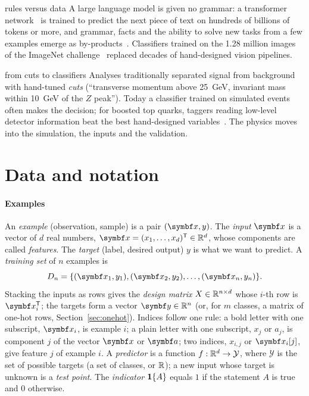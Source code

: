 \documentclass[11pt]{article}
\begin{document}
\begin{modern}{rules versus data}
A large language model is given no grammar: a transformer network~\cite{vaswani2017} is trained to predict the next
piece of text on hundreds of billions of tokens or more, and grammar, facts and the ability to solve new tasks from a
few examples emerge as by-products~\cite{brown2020}. Classifiers trained on the 1.28 million images of the ImageNet
challenge~\cite{russakovsky2015} replaced decades of hand-designed vision pipelines.
\end{modern}

\begin{physics}{from cuts to classifiers}
Analyses traditionally separated signal from background with hand-tuned \emph{cuts} (``transverse momentum above
25~GeV, invariant mass within 10~GeV of the $Z$ peak''). Today a classifier trained on simulated events often makes
the decision; for boosted top quarks, taggers reading low-level detector information beat the best hand-designed
variables~\cite{kasieczka2019}. The physics moves into the simulation, the inputs and the validation.
\end{physics}

\section{Data and notation}\label{sec:notation}

\paragraph{Examples} An \emph{example} (observation, sample) is a pair $(\x, y)$. The \emph{input} $\x$ is a
vector of $d$ real numbers, $\x = (x_1, \dots, x_d)\T \in \R^d$, whose components are called \emph{features}. The
\emph{target} (label, desired output) $y$ is what we want to predict. A \emph{training set} of $n$ examples is
\[
  D_n = \{(\x_1, y_1), (\x_2, y_2), \dots, (\x_n, y_n)\}.
\]
Stacking the inputs as rows gives the \emph{design matrix} $X \in \mathbb{R}^{n \times d}$ whose $i$-th row is $\x_i\T$; the
targets form a vector $\vect{y} \in \R^n$ (or, for $m$ classes, a matrix of one-hot rows, Section~\ref{sec:onehot}).
Indices follow one rule: a bold letter with one subscript, $\x_i$, is example $i$; a plain letter with one subscript,
$x_j$ or $a_j$, is component $j$ of the vector $\x$ or $\vect{a}$; two indices, $x_{i,j}$ or $\x_i[j]$, give feature
$j$ of example $i$. A \emph{predictor} is a function $f : \mathbb{R}^d \to \mathcal{Y}$, where $\mathcal{Y}$ is the set of
possible targets (a set of classes, or $\mathbb{R}$); a new input whose target is unknown is a \emph{test point}. The \emph{indicator} $\mathbf{1}\!\left\{A\right\}$ equals $1$ if the statement $A$ is true and $0$ otherwise.
\end{document}
